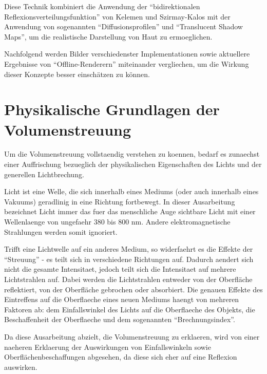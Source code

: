 \documentclass[ngerman,runningheads,a4paper]{llncs}[2018/03/10]
\begin{document}
Diese Technik kombiniert die Anwendung der \enquote{bidirektionalen Reflexionsverteilungsfunktion} von Kelemen und Szirmay-Kalos mit der Anwendung von sogenannten \enquote{Diffusionsprofilen} und \enquote{Translucent Shadow Maps}, um die realistische Darstellung von Haut zu ermoeglichen.

Nachfolgend werden Bilder verschiedenster Implementationen sowie aktuellere Ergebnisse von \enquote{Offline-Renderern} miteinander vergliechen, um die Wirkung dieser Konzepte besser einschätzen zu können.

\section{Physikalische Grundlagen der Volumenstreuung}

Um die Volumenstreuung vollstaendig verstehen zu koennen, bedarf es zunaechst einer Auffrischung bezueglich der physikalischen Eigenschaften des Lichts und der generellen Lichtbrechung.

Licht ist eine Welle, die sich innerhalb eines Mediums (oder auch innerhalb eines Vakuums) geradlinig in eine Richtung fortbewegt.
In dieser Ausarbeitung bezeichnet Licht immer das fuer das menschliche Auge sichtbare Licht mit einer Wellenlaenge von ungefaehr 380 bis 800 nm. Andere elektromagnetische Strahlungen werden somit ignoriert.

Trifft eine Lichtwelle auf ein anderes Medium, so widerfaehrt es die Effekte der \enquote{Streuung} - es teilt sich in verschiedene Richtungen auf. Dadurch aendert sich nicht die gesamte Intensitaet, jedoch teilt sich die Intensitaet auf mehrere Lichtstrahlen auf.
Dabei werden die Lichtstrahlen entweder von der Oberfläche reflektiert, von der Oberfläche gebrochen oder absorbiert.
Die genauen Effekte des Eintreffens auf die Oberflaeche eines neuen Mediums haengt von mehreren Faktoren ab: dem Einfallswinkel des Lichts auf die Oberflaeche des Objekts, die Beschaffenheit der Oberflaeche und dem sogenannten \enquote{Brechnungsindex}.

Da diese Ausarbeitung abzielt, die Volumenstreuung zu erklaeren, wird von einer naeheren Erklaerung der Auswirkungen von Einfallswinkeln sowie Oberflächenbeschaffungen abgesehen, da diese sich eher auf eine Reflexion auswirken.
\end{document}
